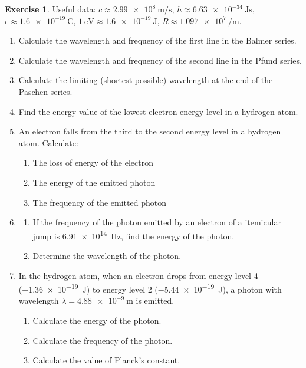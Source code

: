 \documentclass[a4paper]{amsbook}
\theoremstyle{definition}
\newtheorem{exercise}{Exercise}
\numberwithin{exercise}{chapter}
\numberwithin{exercise}{chapter}
\begin{document}
\begin{exercise}
  Useful data: $ c \approx \SI{2.99e8}{\metre\per\second} $, $ h \approx \SI{6.63e-34}{\joule\second} $,
  $ e \approx \SI{1.6e-19}{\coulomb} $, $ \SI{1}{\electronvolt} \approx \SI{1.6e-19}{\joule} $, $ R \approx \SI{1.097e7}{\per\metre} $.
  \begin{enumerate}
    \item Calculate the wavelength and frequency of the first line in the Balmer series.
    \item Calculate the wavelength and frequency of the second line in the Pfund series.
    \item Calculate the limiting (shortest possible) wavelength at the end of the Paschen series.
    \item Find the energy value of the lowest electron energy level in a hydrogen atom.
    \item An electron falls from the third to the second energy level in a hydrogen atom. Calculate:
      \begin{enumerate}
        \item The loss of energy of the electron
        \item The energy of the emitted photon
        \item The frequency of the emitted photon
      \end{enumerate}
    \item
      \begin{enumerate}
        \item If the frequency of the photon emitted by an electron of a itemicular jump is \SI{6.91e14}{\hertz},
              find the energy of the photon.
        \item Determine the wavelength of the photon.
      \end{enumerate}
    \item In the hydrogen atom, when an electron drops from energy level 4 (\SI{-1.36e-19}{\joule}) to
              energy level 2 (\SI{-5.44e-19}{\joule}), a photon with wavelength $ \lambda = \SI{4.88e-9}{\metre} $ is emitted.
      \begin{enumerate}
        \item Calculate the energy of the photon.
        \item Calculate the frequency of the photon.
        \item Calculate the value of Planck's constant.
      \end{enumerate}
  \end{enumerate}
\end{exercise}
\end{document}
